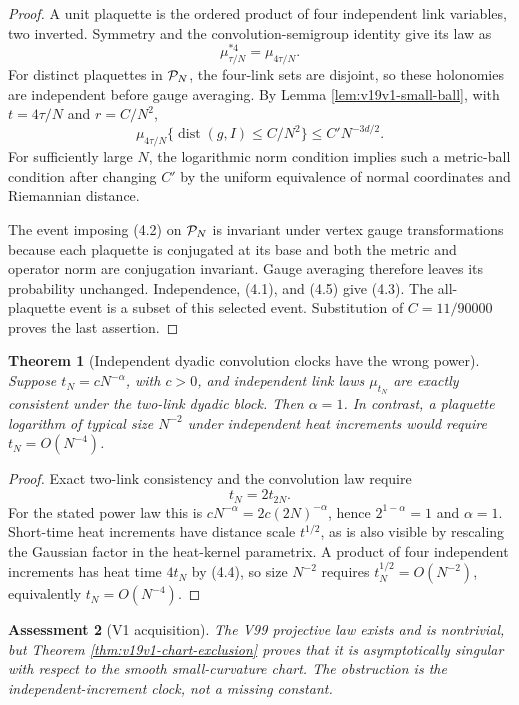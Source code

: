 \documentclass[11pt]{article}
\newtheorem{theorem}{Theorem}[section]
\newtheorem{assessment}[theorem]{Assessment}
\theoremstyle{remark}
\begin{document}
\begin{proof}
A unit plaquette is the ordered product of four independent link variables,
two inverted.  Symmetry and the convolution-semigroup identity give its
law as
\[
 \mu_{\tau/N}^{*4}=\mu_{4\tau/N}.                          \tag{4.4}
\]
For distinct plaquettes in \({\cal P}_N\), the four-link sets are disjoint,
so these holonomies are independent before gauge averaging.  By Lemma
\ref{lem:v19v1-small-ball}, with \(t=4\tau/N\) and \(r=C/N^2\),
\[
 \mu_{4\tau/N}\{\operatorname{dist}(g,I)\le C/N^2\}
 \le C'N^{-3d/2}.                                         \tag{4.5}
\]
For sufficiently large \(N\), the logarithmic norm condition implies such
a metric-ball condition after changing \(C'\) by the uniform equivalence
of normal coordinates and Riemannian distance.

The event imposing (4.2) on \({\cal P}_N\) is invariant under vertex gauge
transformations because each plaquette is conjugated at its base and both
the metric and operator norm are conjugation invariant.  Gauge averaging
therefore leaves its probability unchanged.  Independence, (4.1), and
(4.5) give (4.3).  The all-plaquette event is a subset of this selected
event.  Substitution of \(C=11/90000\) proves the last assertion.
\end{proof}

\begin{theorem}[Independent dyadic convolution clocks have the wrong power]
\label{thm:v19v1-clock}
Suppose \(t_N=cN^{-\alpha}\), with \(c>0\), and independent link laws
\(\mu_{t_N}\) are exactly consistent under the two-link dyadic block.
Then \(\alpha=1\).  In contrast, a plaquette logarithm of typical size
\(N^{-2}\) under independent heat increments would require
\(t_N=O(N^{-4})\).
\end{theorem}

\begin{proof}
Exact two-link consistency and the convolution law require
\[
 t_N=2t_{2N}.
\]
For the stated power law this is
\(cN^{-\alpha}=2c(2N)^{-\alpha}\), hence
\(2^{1-\alpha}=1\) and \(\alpha=1\).  Short-time heat increments have
distance scale \(t^{1/2}\), as is also visible by rescaling the Gaussian
factor in the heat-kernel parametrix.  A product of four independent
increments has heat time \(4t_N\) by (4.4), so size \(N^{-2}\) requires
\(t_N^{1/2}=O(N^{-2})\), equivalently \(t_N=O(N^{-4})\).
\end{proof}

\begin{assessment}[V1 acquisition]
\label{ass:v19v1}
The V99 projective law exists and is nontrivial, but Theorem
\ref{thm:v19v1-chart-exclusion} proves that it is asymptotically singular
with respect to the smooth small-curvature chart.  The obstruction is the
independent-increment clock, not a missing constant.
\end{assessment}
\end{document}

